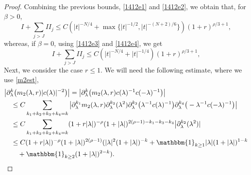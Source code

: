 \documentclass[10pt,leqno]{amsart}
\numberwithin{equation}{section}
\newcommand{\one}{\mathbbm{1}}
\begin{document}
\begin{proof}
Combining the previous bounds, \eqref{1412e1} and \eqref{1412e2}, we obtain that, for $\beta > 0$,
$$I+\sum_{j>J}II_j  \leq C (|t|^{-N/4} +\max\{|t|^{-1/2},|t|^{-(N+2)/6}\}) (1+r)^{\rho/3 +1},$$
whereas, if $\beta=0$, using \eqref{1412e3} and \eqref{1412e4}, we get
$$I+\sum_{j>J}II_j  \leq C (|t|^{-N/4} +|t|^{-1/4}) (1+r)^{\rho/3 +1},$$
Next, we consider the case $r\leq 1$. We will need the following estimate, where we use \eqref{m2est},
\begin{align}
\label{estm22}
&\big|\partial_\lambda^k\big(m_2 (\lambda ,r) | c(\lambda)|^{-2}\big)\big|
=\big|\partial_\lambda^k\big(m_2 (\lambda ,r) c(\lambda)^{-1}c(-\lambda)^{-1}\big)\big|
\nonumber\\
&\quad \leq C \sum_{k_1 +k_2 +k_3 +k_4=k}
\big|\partial_\lambda^{k_1} m_2(\lambda,r)\partial_\lambda^{k_2}(\lambda^2)\partial_\lambda^{k_3}\big(\lambda^{-1}c(\lambda)^{-1}\big)\partial_\lambda^{k_4}\big(-\lambda^{-1} c(-\lambda)^{-1}\big)\big|\nonumber\\
&\quad\leq C \sum_{k_1+k_2+k_3+k_4=k} (1+r |\lambda|)^{-\rho}  (1+|\lambda|)^{2(\rho -1) - k_1 - k_3-k_4} \big|\partial_\lambda^{k_2}(\lambda^2)|\nonumber\\
&\quad\leq C (1+r|\lambda|)^{-\rho} (1+|\lambda|)^{2(\rho -1)}   (  |\lambda|^2 (1+|\lambda|)^{- k}+ \one_{k\geq 1} |\lambda| (1+|\lambda|)^{1- k} \\
&\qquad +\one_{k\geq 2}  (1+|\lambda|)^{2- k}).\nonumber
\end{align}



\end{proof}
\end{document}
